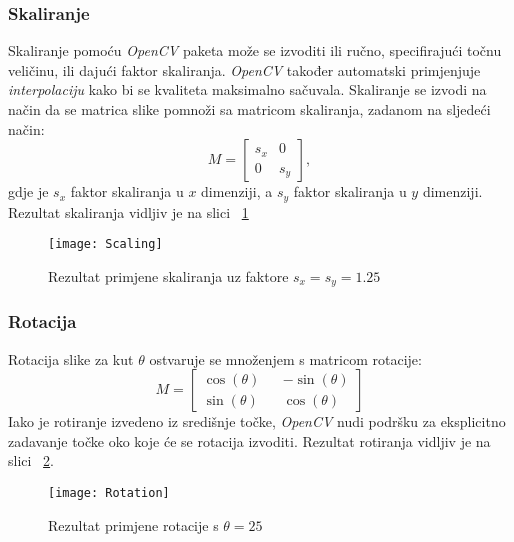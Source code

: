 \subsubsection{Skaliranje}
Skaliranje pomoću \emph{OpenCV} paketa može se izvoditi ili ručno, specifirajući točnu veličinu, ili dajući faktor skaliranja.
\emph{OpenCV} također automatski primjenjuje \emph{interpolaciju} kako bi se kvaliteta maksimalno sačuvala.
Skaliranje se izvodi na način da se matrica slike pomnoži sa matricom skaliranja, zadanom na sljedeći način:
$$
M
=
\begin{bmatrix}
	s_{x} & 0 \\
	0 & s_{y}
\end{bmatrix},
$$
gdje je $s_{x}$ faktor skaliranja u $x$ dimenziji, a $s_{y}$ faktor skaliranja u $y$ dimenziji.
Rezultat skaliranja vidljiv je na slici ~\ref{fig:scaling}
\lstset{numbers=left}

\begin{figure}[h!]
	\centering
	\texttt{[image: Scaling]}
	 \caption{Rezultat primjene skaliranja uz faktore $s_{x} = s_{y} = 1.25$}
 	 \label{fig:scaling}
\end{figure}
\subsubsection{Rotacija}
Rotacija slike za kut $\theta$ ostvaruje se množenjem s matricom rotacije:
$$
M
=
\begin{bmatrix}
	\cos(\theta) && -\sin(\theta) \\
	\sin(\theta) && \cos(\theta)
\end{bmatrix}
$$
Iako je rotiranje izvedeno iz središnje točke, \emph{OpenCV} nudi podršku za eksplicitno zadavanje točke oko koje će se rotacija izvoditi.
Rezultat rotiranja vidljiv je na slici ~\ref{fig:Rotating}.
\lstset{numbers=left}

\begin{figure}[h!]
	\centering
	\texttt{[image: Rotation]}
	 \caption{Rezultat primjene rotacije s $\theta = 25$}
 	 \label{fig:Rotating}
\end{figure}
